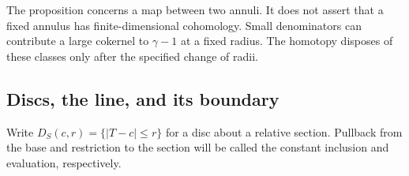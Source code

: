 \begin{remark}\label{rem:kum-fixed-annulus}
The proposition concerns a map between two annuli.  It does not
assert that a fixed annulus has finite-dimensional cohomology.
Small denominators can contribute a large cokernel to
$\gamma-1$ at a fixed radius.  The homotopy disposes of these
classes only after the specified change of radii.
\end{remark}

\subsection{Discs, the line, and its boundary}

Write $D_S(c,r)=\{|T-c|\leq r\}$ for a disc about a relative
section.  Pullback from the base and restriction to the section
will be called the constant inclusion and evaluation, respectively.

